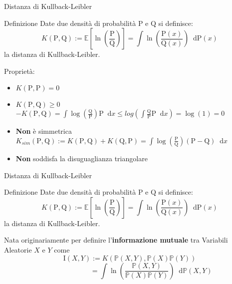 \documentclass{beamer}
\newcommand*\diff{\mathop{}\!\mathrm{d}}
\newcommand{\1}{\mathbbm{1}}
\begin{document}
\begin{frame}{Distanza di Kullback-Leibler}
\begin{block}{Definizione}
Date due densità di probabilità $\mathrm{P}$ e $\mathrm{Q}$ si definisce:
\[
K(\mathrm{P},\mathrm{Q}):=
\mathbb{E}\left[\ln{\left(\frac{\mathrm{P}}{\mathrm{Q}}\right)}\right] =
\int \ln{\left(\frac{\mathrm{P}(x)}{\mathrm{Q}(x)}\right)} \diff\mathrm{P}(x)
\]
la distanza di Kullback-Leibler.
\end{block}
\pause
Proprietà:
\begin{itemize}
\item $K(\mathrm{P},\mathrm{P})=0$
\item $K(\mathrm{P},\mathrm{Q})\geq 0$\\
\qquad $-K(\mathrm{P},\mathrm{Q}) = \int \log(\frac{\mathrm{Q}}{\mathrm{P}})\mathrm{P}\diff x
 \leq log(\int\frac{\mathrm{Q}}{\mathrm{P}}\mathrm{P}\diff x) = \log(1) = 0$
\item \textbf{Non} è simmetrica\\
\qquad $K_{sim}(\mathrm{P},\mathrm{Q}) := K(\mathrm{P},\mathrm{Q}) + K(\mathrm{Q},\mathrm{P}) 
 = \int\log(\frac{\mathrm{P}}{\mathrm{Q}})(\mathrm{P}-\mathrm{Q})\diff x$
\item \textbf{Non} soddisfa la disuguaglianza triangolare
\end{itemize}
\end{frame}

\begin{frame}{Distanza di Kullback-Leibler}
\vspace{-5pt}
\begin{block}{Definizione}
Date due densità di probabilità $\mathrm{P}$ e $\mathrm{Q}$ si definisce:
\[
K(\mathrm{P},\mathrm{Q}):=
\mathbb{E}\left[\ln{\left(\frac{\mathrm{P}}{\mathrm{Q}}\right)}\right] =
\int \ln{\left(\frac{\mathrm{P}(x)}{\mathrm{Q}(x)}\right)} \diff\mathrm{P}(x)
\]
la distanza di Kullback-Leibler.
\end{block}
\vspace{10pt}

Nata originariamente per definire l'\textbf{informazione mutuale} tra Variabili Aleatorie $X$ e $Y$ come
\[
\mathrm{I}(X,Y) := K(\mathbb{P}(X,Y),\mathbb{P}(X)\mathbb{P}(Y))
\]
\vspace{-15pt}
\[
\qquad\qquad\qquad \,=\int \ln{\left(\frac{\mathbb{P}(X,Y)}{\mathbb{P}(X)\mathbb{P}(Y)}\right)} \diff\mathbb{P}(X,Y)
\]
\end{frame}
\end{document}
